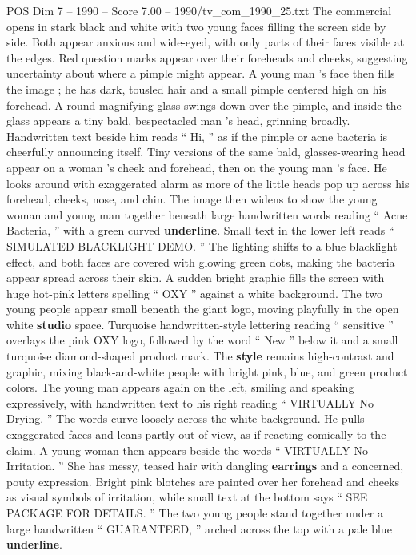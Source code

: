 \begin{textsample}{POS Dim 7 – 1990 – Score 7.00 – 1990/tv\_com\_1990\_25.txt}  \label{ex:f7_pos_066}
The commercial opens in stark black and white with two young faces filling the screen side by side.
Both appear anxious and wide-eyed, with only parts of their faces visible at the edges.
Red question marks appear over their foreheads and cheeks, suggesting uncertainty about where a pimple might appear.
A young man ’s face then fills the image ; he has dark, tousled hair and a small pimple centered high on his forehead.
A round magnifying glass swings down over the pimple, and inside the glass appears a tiny bald, bespectacled man ’s head, grinning broadly.
Handwritten text beside him reads “ Hi, ” as if the pimple or acne bacteria is cheerfully announcing itself.
Tiny versions of the same bald, glasses-wearing head appear on a woman ’s cheek and forehead, then on the young man ’s face.
He looks around with exaggerated alarm as more of the little heads pop up across his forehead, cheeks, nose, and chin.
The image then widens to show the young woman and young man together beneath large handwritten words reading “ Acne Bacteria, ” with a green curved \textbf{underline}.
Small text in the lower left reads “ SIMULATED BLACKLIGHT DEMO. ” The lighting shifts to a blue blacklight effect, and both faces are covered with glowing green dots, making the bacteria appear spread across their skin.
A sudden bright graphic fills the screen with huge hot-pink letters spelling “ OXY ” against a white background.
The two young people appear small beneath the giant logo, moving playfully in the open white \textbf{studio} space.
Turquoise handwritten-style lettering reading “ sensitive ” overlays the pink OXY logo, followed by the word “ New ” below it and a small turquoise diamond-shaped product mark.
The \textbf{style} remains high-contrast and graphic, mixing black-and-white people with bright pink, blue, and green product colors.
The young man appears again on the left, smiling and speaking expressively, with handwritten text to his right reading “ VIRTUALLY No Drying. ” The words curve loosely across the white background.
He pulls exaggerated faces and leans partly out of view, as if reacting comically to the claim.
A young woman then appears beside the words “ VIRTUALLY No Irritation. ” She has messy, teased hair with dangling \textbf{earrings} and a concerned, pouty expression.
Bright pink blotches are painted over her forehead and cheeks as visual symbols of irritation, while small text at the bottom says “ SEE PACKAGE FOR DETAILS. ” The two young people stand together under a large handwritten “ GUARANTEED, ” arched across the top with a pale blue \textbf{underline}.

\end{textsample}

